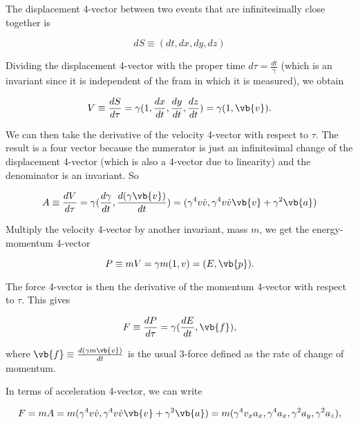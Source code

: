 \documentclass[english,a4paper,12pt]{report}
\begin{document}
The displacement 4-vector between two events that are infinitesimally close together is 

\begin{equation}
    dS \equiv (dt,dx,dy,dz)
\end{equation}

Dividing the displacement 4-vector with the proper time \(d \tau = \frac{dt}{\gamma } \) (which is an invariant since it is independent of the fram in which it is measured), we obtain 

\begin{equation}
    V \equiv  \frac{dS}{d\tau } = \gamma (1, \frac{dx}{dt}, \frac{dy}{dt}, \frac{dz}{dt}) = \gamma (1, \vb{v} ).
\end{equation}

We can then take the derivative of the velocity 4-vector with respect to \(\tau \). The result is a four vector because the numerator is just an infinitesimal change of the displacement 4-vector (which is also a 4-vector due to linearity) and the denominator is an invariant. So

\begin{equation}
    A \equiv  \frac{dV}{d\tau } = \gamma (\frac{d\gamma }{dt}, \frac{d(\gamma \vb{v} )}{dt}) = (\gamma ^{4}v \dot{v} , \gamma ^{4} v \dot{v} \vb{v} + \gamma ^2 \vb{a})
\end{equation}

Multiply the velocity 4-vector by another invariant, mass \(m\), we get the energy-momentum 4-vector

\begin{equation}
    P \equiv mV = \gamma m(1,v) = (E, \vb{p} ). 
\end{equation}

The force 4-vector is then the derivative of the momentum 4-vector with respect to \(\tau \). This gives

\begin{equation}
    F \equiv \frac{dP}{d\tau } = \gamma (\frac{dE}{dt}, \vb{f}),
\end{equation}

where \(\vb{f} \equiv \frac{d(\gamma m\vb{v} )}{dt} \) is the usual 3-force defined as the rate of change of momentum.  

In terms of acceleration 4-vector, we can write 

\begin{equation}
    F = mA = m(\gamma ^{4}v \dot{v} , \gamma ^{4} v \dot{v} \vb{v}  + \gamma ^2 \vb{a}  ) = m(\gamma ^{4} v_{x} a_{x}, \gamma ^{4} a_{x}, \gamma ^2 a_{y}, \gamma ^2 a_{z}),
\end{equation}
\end{document}
